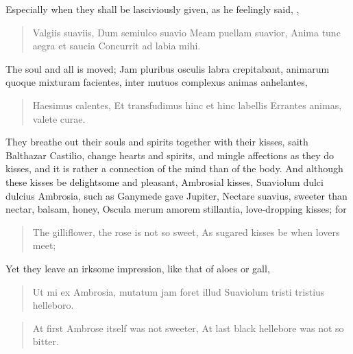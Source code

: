 Especially when they shall be lasciviously given, as he feelingly said,
, 

\begin{latin}
\begin{verse}
Valgiis suaviis,
Dum semiulco suavio
Meam puellam suavior,
Anima tunc aegra et saucia
Concurrit ad labia mihi.
\end{verse}
\end{latin}

The soul and all is moved; Jam pluribus osculis labra
crepitabant, animarum quoque mixturam facientes, inter mutuos complexus
animas anhelantes,

\begin{latin}
\begin{verse}
Haesimus calentes,
Et transfudimus hinc et hinc labellis
Errantes animas, valete curae.
\end{verse}
\end{latin}

They breathe out their souls and spirits together with their kisses,
saith Balthazar Castilio, change hearts and spirits, and mingle
affections as they do kisses, and it is rather a connection of the mind
than of the body. And although these kisses be delightsome and
pleasant, Ambrosial kisses, Suaviolum dulci dulcius Ambrosia,
such as  Ganymede gave Jupiter, Nectare suavius, sweeter than
nectar, balsam, honey, Oscula merum amorem stillantia,
love-dropping kisses; for

\begin{verse}%
The gilliflower, the rose is not so sweet,
As sugared kisses be when lovers meet;
\end{verse}%

Yet they leave an irksome impression, like that of aloes or gall,

\begin{latin}
\begin{verse}
Ut mi ex Ambrosia, mutatum jam foret illud
Suaviolum tristi tristius helleboro.
\end{verse}
\end{latin}
\translationrule%
\begin{verse}%
At first Ambrose itself was not sweeter,
At last black hellebore was not so bitter.
\end{verse}%

